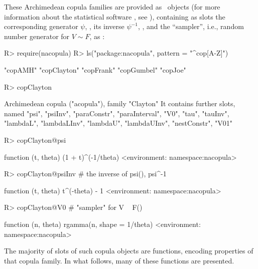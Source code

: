 \documentclass[nojss,article]{jss}
\theoremstyle{mythmstyle}
\newcommand*{\R}{\proglang{R}}%
\newcommand*{\psii}{{\psi^{-1}}}
\begin{document}
These Archimedean copula families are provided as  \R\
objects (for more information about the statistical software \R, see \citet[2.11.1]{r}), containing as slots the corresponding generator
$\psi$, \code{psi}, its inverse $\psii$, \code{psiInv},
and the ``sampler'', i.e., random number generator for $V\sim F$, as :
\begin{Schunk}
\begin{Sinput}
R> require(nacopula)
R> ls("package:nacopula", pattern = "^cop[A-Z]")
\end{Sinput}
\begin{Soutput}
[1] "copAMH"     "copClayton" "copFrank"   "copGumbel"  "copJoe"    
\end{Soutput}
\begin{Sinput}
R> copClayton
\end{Sinput}
\begin{Soutput}
Archimedean copula ("acopula"), family "Clayton"
 It contains further slots, named
  "psi", "psiInv", "paraConstr", "paraInterval", "V0", "tau",
  "tauInv", "lambdaL", "lambdaLInv", "lambdaU", "lambdaUInv",
  "nestConstr", "V01"
\end{Soutput}
\begin{Sinput}
R> copClayton@psi
\end{Sinput}
\begin{Soutput}
function (t, theta) 
{
    (1 + t)^(-1/theta)
}
<environment: namespace:nacopula>
\end{Soutput}
\begin{Sinput}
R> copClayton@psiInv # the inverse of psi(), psi^{-1}
\end{Sinput}
\begin{Soutput}
function (t, theta) 
{
    t^(-theta) - 1
}
<environment: namespace:nacopula>
\end{Soutput}
\begin{Sinput}
R> copClayton@V0     # "sampler" for  V ~ F()
\end{Sinput}
\begin{Soutput}
function (n, theta) 
{
    rgamma(n, shape = 1/theta)
}
<environment: namespace:nacopula>
\end{Soutput}
\end{Schunk}
The majority of slots of such copula objects are functions, encoding properties
of that copula family. In what follows, many of these functions are presented.
\end{document}
